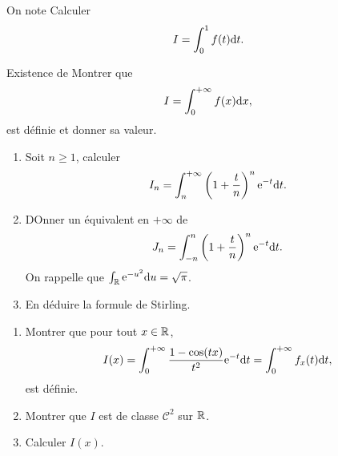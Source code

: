 \documentclass[12pt]{article}
\begin{document}
\begin{exercise}
    On note \function{f}{]0,1]}{\R}{t}{\frac{1}{t}-\left\lfloor\frac{1}{t}\right\rfloor}
    Calculer 
    \begin{equation}
        I=\int_{0}^{1}f(t)\mathrm{d} t.
    \end{equation}
\end{exercise}

\begin{exercise}
    Existence de 
    Montrer que 
    \begin{equation}
        I=\int_{0}^{+\infty}f(x)\mathrm{d} x,
    \end{equation}
    est définie et donner sa valeur.
\end{exercise}

\begin{exercise}
    \phantom{}
    \begin{enumerate}
        \item Soit $n\geqslant1$, calculer 
        \begin{equation}
            I_n=\int_{n}^{+\infty}\left(1+\frac{t}{n}\right)^{n}\mathrm{e}^{-t}\mathrm{d} t.
        \end{equation}
        \item DOnner un équivalent en $+\infty$ de 
        \begin{equation}
            J_n=\int_{-n}^{n}\left(1+\frac{t}{n}\right)^{n}\mathrm{e}^{-t}\mathrm{d} t.
        \end{equation}
        On rappelle que $\int_{\mathbb{R}}\mathrm{e}^{-u^{2}}\mathrm{d} u=\sqrt{\pi}$.

        \item En déduire la formule de Stirling.
    \end{enumerate}
\end{exercise}

\begin{exercise}
    \phantom{}
    \begin{enumerate}
        \item Montrer que pour tout $x\in\mathbb{R}$, 
        \begin{equation}
            I(x)=\int_{0}^{+\infty}\frac{1-\cos(tx)}{t^{2}}\mathrm{e}^{-t}\mathrm{d} t=\int_{0}^{+\infty}f_x(t)\mathrm{d} t,
        \end{equation}
        est définie.
        \item Montrer que $I$ est de classe $\mathcal{C}^{2}$ sur $\mathbb{R}$.
        \item Calculer $I(x)$.
    \end{enumerate}
\end{exercise}
\end{document}
